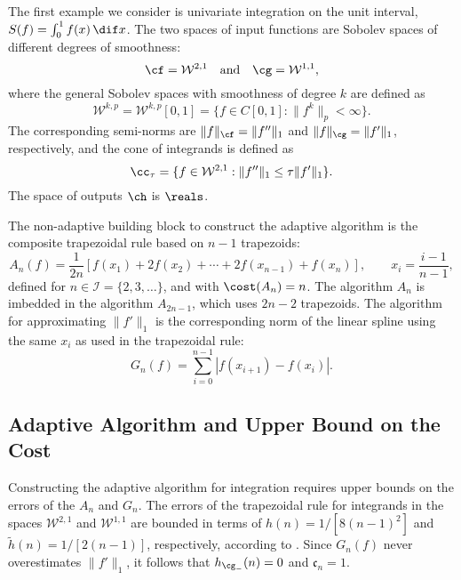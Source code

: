 The first example we consider is univariate integration on the unit interval, $S(f)=\int_{0}^{1}f(x) \, \dif x$.  The two spaces of input functions are Sobolev spaces of different degrees of smoothness:
\begin{equation*}
  \cf=\mathcal{W}^{2,1} \quad \text{and} \quad
  \cg=\mathcal{W}^{1,1},
\end{equation*}
where the general Sobolev spaces with smoothness of degree $k$ are defined as 
\begin{equation} \label{defSobolev}
  \mathcal{W}^{k,p}=\mathcal{W}^{k,p}[0,1]=\{f\in C[0,1]: \|f^{k}\|_{p}<\infty\}.
\end{equation}
The corresponding semi-norms are $\|f\|_{\cf}=\|f''\|_{1}$ and $\|f\|_{\cg}=\|f'\|_{1}$, respectively, and the cone of integrands is defined as  
\begin{equation}\label{coneinteg}
\cc_{\tau}=\{f\in \mathcal{W}^{2,1}:\|f''\|_1\leq\tau\|f'\|_1\}.
\end{equation}
The space of outputs $\ch$ is $\reals$.

The non-adaptive building block to construct the adaptive algorithm is the composite trapezoidal rule based on $n-1$ trapezoids:
\begin{equation*}
    A_{n}(f)
    =\frac{1}{2n}[f(x_1)+2f(x_2)+\cdots+2f(x_{n-1})+f(x_n)], \qquad x_i=\frac{i-1}{n-1},
\end{equation*}
defined for $n \in \mathcal{I}=\{2,3,\ldots\}$, and with $\cost(A_n)=n$.  The algorithm $A_n$ is imbedded in the algorithm $A_{2n-1}$, which uses $2n-2$ trapezoids.  
The algorithm for approximating $\|f'\|_{1}$ is the corresponding norm of the linear spline using the same $x_i$ as used in the trapezoidal rule:
\begin{equation}\label{1direst}
    G_n(f)=\sum_{i=0}^{n-1}\left|f(x_{i+1})-f(x_{i})\right|.
\end{equation} 

\subsection{Adaptive Algorithm and Upper Bound on the Cost}

Constructing the adaptive algorithm for integration requires upper bounds on the errors of the $A_n$ and $G_n$.  The errors of the trapezoidal rule for integrands in the spaces $\mathcal{W}^{2,1}$ and $\mathcal{W}^{1,1}$ are bounded in terms of $h(n)=1/[8(n-1)^2]$ and $\tilde{h}(n)=1/[2(n-1)]$, respectively, according to \cite[(7.14) and (7.15)]{BraPet11a}.  Since $G_{n}(f)$ never overestimates $\|f'\|_{1}$, it follows that $h_{\cg_{-}}(n)=0$ and $\mathfrak{c}_n=1$. 

